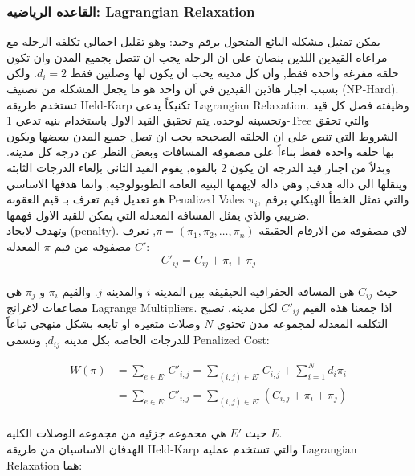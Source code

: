 \documentclass{article}
\newcommand{\en}[1]{\textenglish{#1}}
\begin{document}
\subsubsection{القاعده الرياضيه: \en{Lagrangian Relaxation}}
يمكن تمثيل مشكله البائع المتجول برقم وحيد: وهو تقليل اجمالي تكلفه الرحله مع مراعاه القيدين اللذين ينصان على ان الرحله يجب ان تتصل بجميع المدن وان تكون حلقه مفرغه واحده فقط, وان كل مدينه يحب ان يكون لها وصلتين فقط $d_i = 2$. ولكن بسبب اجبار هاذين القيدين في آن واحد هو ما يجعل المشكله من تصنيف (\en{NP-Hard}). تستخدم طريقه \en{Held-Karp} تكنيكاً يدعى \en{Lagrangian Relaxation}. وظيفته فصل كل قيد وتحسينه لوحده. يتم تحقيق القيد الاول باستخدام بنيه تدعى \en{1-Tree} والتي تحقق الشروط التي تنص على ان الحلقه الصحيحه يجب ان تصل جميع المدن ببعضها ويكون بها حلقه واحده فقط بناءاً على مصفوفه المسافات وبغض النظر عن درجه كل مدينه. وبدلاً من اجبار قيد الدرجه ان يكون 2 بالقوه, يقوم القيد الثاني بإلغاء الدرجات الثابته وينقلها الى داله هدف, وهي داله لايهمها البنيه العامه الطوبولوجيه, وانما هدفها الاساسي هو تعديل قيم تعرف بـ قيم العقوبه \en{Penalized Vales $\pi_i$}, والتي تمثل الخطأ الهيكلي برقم ضريبي والذي يمثل المسافه المعدله التي يمكن للقيد الاول فهمها.\\

وتهدف لايجاد  (\en{penalty}). لاي مصفوفه من الارقام الحقيقه $\pi = (\pi_1, \pi_2, \dots, \pi_n)$, نعرف مصفوفه من قيم $\pi$ المعدله $C'$:\\

{\LARGE$$
	C'_{ij} = C_{ij} + \pi_i + \pi_j
$$}\\

حيث $C_{ij}$ هي المسافه الجفرافيه الحيقيقه بين المدينه $i$ والمدينه $j$. والقيم $\pi_i$ و $\pi_j$ هي مضاعفات لاغرانج \en{Lagrange Multipliers}. اذا جمعنا هذه القيم $C'_{ij}$ لكل مدينه, تصبح التكلفه المعدله لمجموعه مدن تحتوي $N$ وصلات متغيره او تابعه بشكل منهجي تباعاً للدرجات الخاصه بكل مدينه $d_{ij}$, وتسمى \en{Penalized Cost}:

{\LARGE$$
\begin{aligned}
W(\pi) &= \sum_{e \in E'} C'_{i,j} = \sum_{(i,j) \in E'}  C_{i,j} + \sum_{i=1}^{N} d_i\pi_i \\
									&= \sum_{e \in E'} C'_{i,j} = \sum_{(i,j) \in E'} (C_{i,j} + \pi_i + \pi_j)
\end{aligned}
$$}\\

حيث $E'$ هي مجموعه جزئيه من مجموعه الوصلات الكليه $E$.\\

الهدفان الاساسيان من طريقه \en{Held-Karp} والتي تستخدم عمليه \en{Lagrangian Relaxation} هما:
\end{document}
